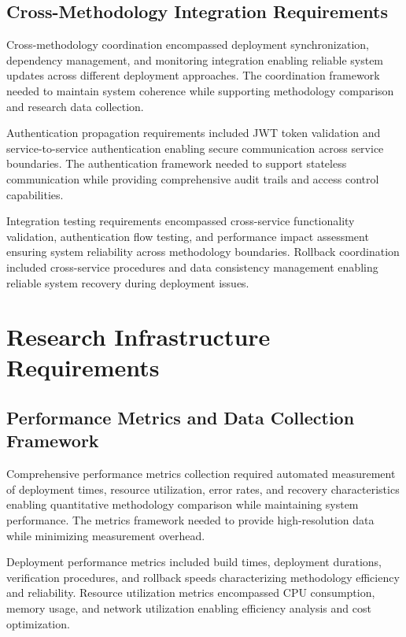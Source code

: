 \subsection{Cross-Methodology Integration Requirements}

Cross-methodology coordination encompassed deployment synchronization, dependency management, and monitoring integration enabling reliable system updates across different deployment approaches. The coordination framework needed to maintain system coherence while supporting methodology comparison and research data collection.

Authentication propagation requirements included JWT token validation and service-to-service authentication enabling secure communication across service boundaries. The authentication framework needed to support stateless communication while providing comprehensive audit trails and access control capabilities.

Integration testing requirements encompassed cross-service functionality validation, authentication flow testing, and performance impact assessment ensuring system reliability across methodology boundaries. Rollback coordination included cross-service procedures and data consistency management enabling reliable system recovery during deployment issues.



\section{Research Infrastructure Requirements}

\subsection{Performance Metrics and Data Collection Framework}

Comprehensive performance metrics collection required automated measurement of deployment times, resource utilization, error rates, and recovery characteristics enabling quantitative methodology comparison while maintaining system performance. The metrics framework needed to provide high-resolution data while minimizing measurement overhead.

Deployment performance metrics included build times, deployment durations, verification procedures, and rollback speeds characterizing methodology efficiency and reliability. Resource utilization metrics encompassed CPU consumption, memory usage, and network utilization enabling efficiency analysis and cost optimization.

